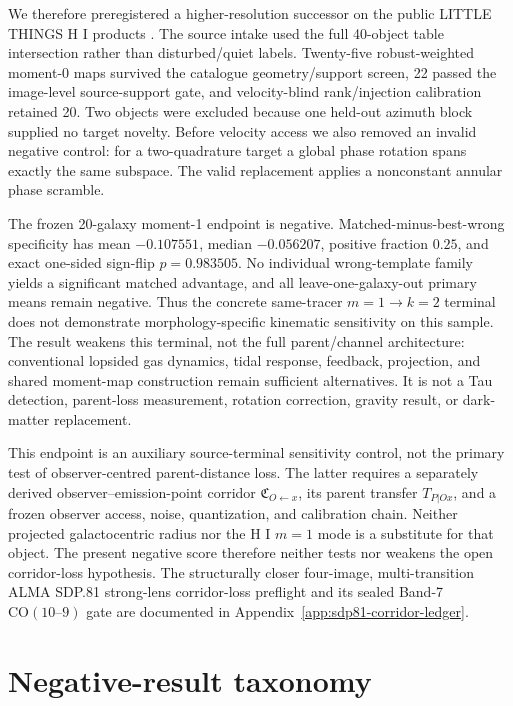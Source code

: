 \documentclass[11pt]{article}
\begin{document}
We therefore preregistered a higher-resolution successor on the public LITTLE
THINGS H I products \cite{Hunter2012LITTLETHINGS,Holwerda2013HIMorphology}.
The source intake used the full 40-object table intersection rather than
disturbed/quiet labels. Twenty-five robust-weighted moment-0 maps survived the
catalogue geometry/support screen, 22 passed the image-level source-support
gate, and velocity-blind rank/injection calibration retained 20. Two objects
were excluded because one held-out azimuth block supplied no target novelty.
Before velocity access we also removed an invalid negative control: for a
two-quadrature target a global phase rotation spans exactly the same subspace.
The valid replacement applies a nonconstant annular phase scramble.

The frozen 20-galaxy moment-1 endpoint is negative. Matched-minus-best-wrong
specificity has mean $-0.107551$, median $-0.056207$, positive fraction $0.25$,
and exact one-sided sign-flip $p=0.983505$. No individual wrong-template
family yields a significant matched advantage, and all leave-one-galaxy-out
primary means remain negative. Thus the concrete same-tracer
$m=1\rightarrow k=2$ terminal does not demonstrate morphology-specific
kinematic sensitivity on this sample. The result weakens this terminal, not
the full parent/channel architecture: conventional lopsided gas dynamics,
tidal response, feedback, projection, and shared moment-map construction remain
sufficient alternatives. It is not a Tau detection, parent-loss measurement,
rotation correction, gravity result, or dark-matter replacement.

This endpoint is an auxiliary source-terminal sensitivity control, not the
primary test of observer-centred parent-distance loss. The latter requires a
separately derived observer--emission-point corridor
$\mathfrak C_{O\leftarrow x}$, its parent transfer $T_{P|Ox}$, and a frozen
observer access, noise, quantization, and calibration chain. Neither projected
galactocentric radius nor the H I $m=1$ mode is a substitute for that object.
The present negative score therefore neither tests nor weakens the open
corridor-loss hypothesis.  The structurally closer four-image, multi-transition ALMA SDP.81
strong-lens corridor-loss preflight and its sealed Band-7
$\mathrm{CO}(10\text{--}9)$ gate are documented in
Appendix~\ref{app:sdp81-corridor-ledger}.

\section{Negative-result taxonomy}
\end{document}
